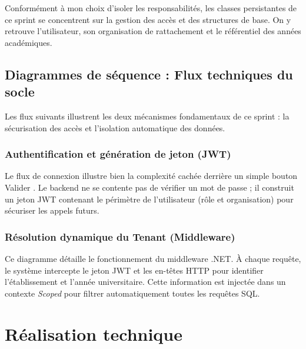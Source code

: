Conformément à mon choix d'isoler les responsabilités, les classes persistantes de ce sprint se concentrent sur la gestion des accès et des structures de base. On y retrouve l'utilisateur, son organisation de rattachement et le référentiel des années académiques.


\subsection{Diagrammes de séquence : Flux techniques du socle}

Les flux suivants illustrent les deux mécanismes fondamentaux de ce sprint : la sécurisation des accès et l'isolation automatique des données.

\subsubsection{Authentification et génération de jeton (JWT)}

Le flux de connexion illustre bien la complexité cachée derrière un simple bouton \og Valider \fg{}. Le backend ne se contente pas de vérifier un mot de passe ; il construit un jeton JWT contenant le périmètre de l'utilisateur (rôle et organisation) pour sécuriser les appels futurs.


\subsubsection{Résolution dynamique du Tenant (Middleware)}

Ce diagramme détaille le fonctionnement du middleware .NET. À chaque requête, le système intercepte le jeton JWT et les en-têtes HTTP pour identifier l'établissement et l'année universitaire. Cette information est injectée dans un contexte \textit{Scoped} pour filtrer automatiquement toutes les requêtes SQL.


\section{Réalisation technique}

